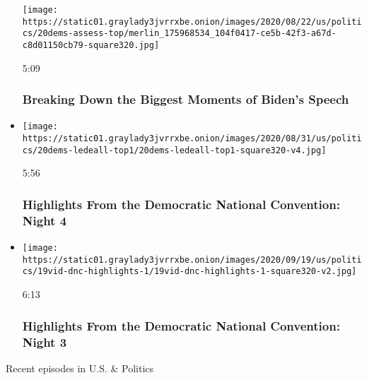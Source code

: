 \begin{itemize}
  \texttt{[image: https://static01.graylady3jvrrxbe.onion/images/2020/08/22/us/politics/20dems-assess-top/merlin\_175968534\_104f0417-ce5b-42f3-a67d-c8d01150cb79-square320.jpg]}

  5:09

  \hypertarget{breaking-down-the-biggest-moments-of-bidens-speech}{%
  \subsubsection{Breaking Down the Biggest Moments of Biden's
  Speech}\label{breaking-down-the-biggest-moments-of-bidens-speech}}
\item
  \href{https://www.nytimes3xbfgragh.onion/video/us/politics/100000007299516/democratic-national-convention-highlights.html?action=click\&module=video-series-bar\&region=header\&pgtype=Article\&playlistId=video/us-politics}{}

  \texttt{[image: https://static01.graylady3jvrrxbe.onion/images/2020/08/31/us/politics/20dems-ledeall-top1/20dems-ledeall-top1-square320-v4.jpg]}

  5:56

  \hypertarget{highlights-from-the-democratic-national-convention-night-4}{%
  \subsubsection{Highlights From the Democratic National Convention:
  Night
  4}\label{highlights-from-the-democratic-national-convention-night-4}}
\item
  \href{https://www.nytimes3xbfgragh.onion/video/us/politics/100000007297733/democratic-national-convention-highlights.html?action=click\&module=video-series-bar\&region=header\&pgtype=Article\&playlistId=video/us-politics}{}

  \texttt{[image: https://static01.graylady3jvrrxbe.onion/images/2020/09/19/us/politics/19vid-dnc-highlights-1/19vid-dnc-highlights-1-square320-v2.jpg]}

  6:13

  \hypertarget{highlights-from-the-democratic-national-convention-night-3}{%
  \subsubsection{Highlights From the Democratic National Convention:
  Night
  3}\label{highlights-from-the-democratic-national-convention-night-3}}
\end{itemize}

Recent episodes in U.S. \& Politics

